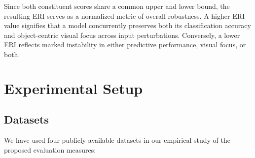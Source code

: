 \documentclass[a4paper,fleqn]{cas-dc}
\begin{document}
	Since both constituent scores share a common upper and lower bound, the resulting ERI serves as a normalized metric of overall robustness. 
	A higher ERI value signifies that a model concurrently preserves both its classification accuracy and object-centric visual focus across input perturbations. 
	Conversely, a lower ERI reflects marked instability in either predictive performance, visual focus, or both.
	
	\section{Experimental Setup}	
	\subsection{Datasets}
	We have used four publicly available datasets in our empirical study of the proposed evaluation measures: 
	
\end{document}
